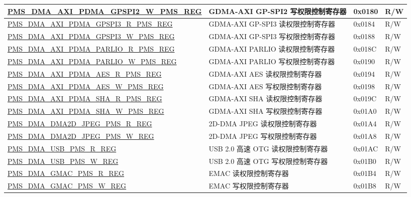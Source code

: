 \begin{longtable}{ | L{7.5cm} | L{6cm} | L{1.3cm} | L{1cm} | }
\hyperref[regdesc:PMSDMAAXIPDMAGPSPI2WPMSREG]{PMS\_DMA\_AXI\_PDMA\_GPSPI2\_W\_PMS\_REG} & GDMA-AXI GP-SPI2 写权限控制寄存器 & 0x0180 & R/W \\ \hline
\hyperref[regdesc:PMSDMAAXIPDMAGPSPI3RPMSREG]{PMS\_DMA\_AXI\_PDMA\_GPSPI3\_R\_PMS\_REG} & GDMA-AXI GP-SPI3 读权限控制寄存器 & 0x0184 & R/W \\ \hline
\hyperref[regdesc:PMSDMAAXIPDMAGPSPI3WPMSREG]{PMS\_DMA\_AXI\_PDMA\_GPSPI3\_W\_PMS\_REG} & GDMA-AXI GP-SPI3 写权限控制寄存器 & 0x0188 & R/W \\ \hline
\hyperref[regdesc:PMSDMAAXIPDMAPARLIORPMSREG]{PMS\_DMA\_AXI\_PDMA\_PARLIO\_R\_PMS\_REG} & GDMA-AXI PARLIO 读权限控制寄存器 & 0x018C & R/W \\ \hline
\hyperref[regdesc:PMSDMAAXIPDMAPARLIOWPMSREG]{PMS\_DMA\_AXI\_PDMA\_PARLIO\_W\_PMS\_REG} & GDMA-AXI PARLIO 写权限控制寄存器 & 0x0190 & R/W \\ \hline
\hyperref[regdesc:PMSDMAAXIPDMAAESRPMSREG]{PMS\_DMA\_AXI\_PDMA\_AES\_R\_PMS\_REG} & GDMA-AXI AES 读权限控制寄存器 & 0x0194 & R/W \\ \hline
\hyperref[regdesc:PMSDMAAXIPDMAAESWPMSREG]{PMS\_DMA\_AXI\_PDMA\_AES\_W\_PMS\_REG} & GDMA-AXI AES 写权限控制寄存器 & 0x0198 & R/W \\ \hline
\hyperref[regdesc:PMSDMAAXIPDMASHARPMSREG]{PMS\_DMA\_AXI\_PDMA\_SHA\_R\_PMS\_REG} & GDMA-AXI SHA 读权限控制寄存器 & 0x019C & R/W \\ \hline
\hyperref[regdesc:PMSDMAAXIPDMASHAWPMSREG]{PMS\_DMA\_AXI\_PDMA\_SHA\_W\_PMS\_REG} & GDMA-AXI SHA 写权限控制寄存器 & 0x01A0 & R/W \\ \hline
\hyperref[regdesc:PMSDMADMA2DJPEGPMSRREG]{PMS\_DMA\_DMA2D\_JPEG\_PMS\_R\_REG} & 2D-DMA JPEG 读权限控制寄存器 & 0x01A4 & R/W \\ \hline
\hyperref[regdesc:PMSDMADMA2DJPEGPMSWREG]{PMS\_DMA\_DMA2D\_JPEG\_PMS\_W\_REG} & 2D-DMA JPEG 写权限控制寄存器 & 0x01A8 & R/W \\ \hline
\hyperref[regdesc:PMSDMAUSBPMSRREG]{PMS\_DMA\_USB\_PMS\_R\_REG} & USB 2.0 高速 OTG 读权限控制寄存器 & 0x01AC & R/W \\ \hline
\hyperref[regdesc:PMSDMAUSBPMSWREG]{PMS\_DMA\_USB\_PMS\_W\_REG} & USB 2.0 高速 OTG 写权限控制寄存器 & 0x01B0 & R/W \\ \hline
\hyperref[regdesc:PMSDMAGMACPMSRREG]{PMS\_DMA\_GMAC\_PMS\_R\_REG} & EMAC 读权限控制寄存器 & 0x01B4 & R/W \\ \hline
\hyperref[regdesc:PMSDMAGMACPMSWREG]{PMS\_DMA\_GMAC\_PMS\_W\_REG} & EMAC 写权限控制寄存器 & 0x01B8 & R/W \\ \hline

\end{longtable}
